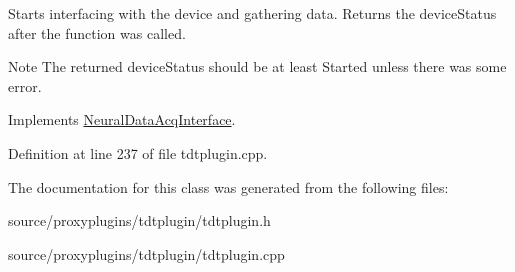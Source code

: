 Starts interfacing with the device and gathering data. Returns the device\-Status after the function was called. 

\begin{DoxyNote}{Note}
The returned device\-Status should be at least Started unless there was some error. 
\end{DoxyNote}


Implements \hyperlink{class_neural_data_acq_interface_afaece5bd061753aa9a4b1e05c0d1e61d}{Neural\-Data\-Acq\-Interface}.



Definition at line 237 of file tdtplugin.\-cpp.



The documentation for this class was generated from the following files\-:\begin{DoxyCompactItemize}
\item 
source/proxyplugins/tdtplugin/tdtplugin.\-h\item 
source/proxyplugins/tdtplugin/tdtplugin.\-cpp\end{DoxyCompactItemize}
